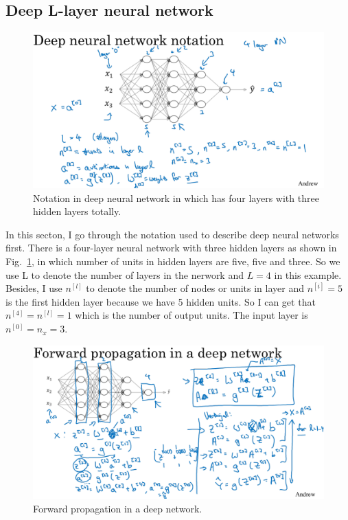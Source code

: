 \documentclass[a4paper]{article}
\begin{document}
\subsection{Deep L-layer neural network}

\begin{figure}
	\begin{center}
		\includegraphics[scale=0.3]{figures/1.png}
	\end{center}
	\caption{Notation in deep neural network in which has four layers with three hidden layers totally.}
	\label{p1}
\end{figure}

In this secton, I go through the notation used to describe deep neural networks first. There is a four-layer neural network with three hidden layers as shown in Fig.~\ref{p1}, in which number of units in hidden layers are five, five and three. So we use L to denote the number of layers in the nerwork and $L = 4$ in this example. Besides, I use $n^{[l]}$ to denote the number of nodes or units in layer and $n^{[i]} = 5$ is the first hidden layer because we have 5 hidden units. So I can get that $n^{[4]} = n^{[l]} = 1$ which is the number of output units. The input layer is $n^{[0]} = n_x = 3$. 
\begin{figure}
	\begin{center}
		\includegraphics[scale=0.3]{figures/2.png}
	\end{center}
	\caption{Forward propagation in a deep network.}
	\label{p2}
\end{figure}
\end{document}
